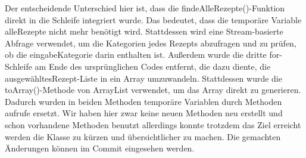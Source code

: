 Der entscheidende Unterschied hier ist, dass die findeAlleRezepte()-Funktion direkt in die Schleife integriert wurde. Das bedeutet, dass die temporäre Variable alleRezepte nicht mehr benötigt wird. Stattdessen wird eine Stream-basierte Abfrage verwendet, um die Kategorien jedes Rezepts abzufragen und zu prüfen, ob die eingabeKategorie darin enthalten ist.
Außerdem wurde die dritte for-Schleife am Ende des ursprünglichen Codes entfernt, die dazu diente, die ausgewähltesRezept-Liste in ein Array umzuwandeln. Stattdessen wurde die toArray()-Methode von ArrayList verwendet, um das Array direkt zu generieren. 
Dadurch wurden in beiden Methoden temporäre Variablen durch Methoden aufrufe ersetzt. Wir haben hier zwar keine neuen Methoden neu erstellt und schon vorhandene Methoden benutzt allerdings konnte trotzdem das Ziel erreicht werden die Klasse zu kürzen und übersichtlicher zu machen. Die gemachten Änderungen können im Commit \href{https://github.com/MichaelaHaag/RezeptApp/commit/4e0bedc859ba644d448fe4c89a3a6e1320519593}{} eingesehen werden. 